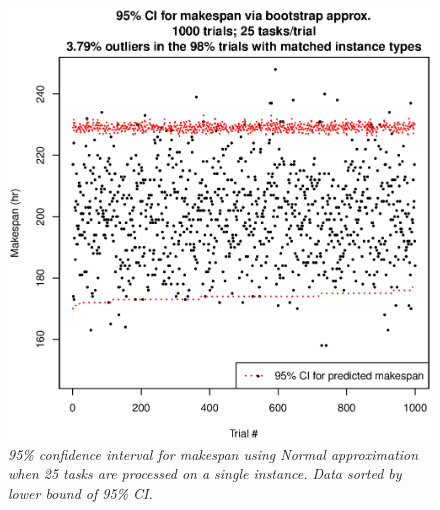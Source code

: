 \documentclass[12pt]{report}
\begin{document}
\begin{figure}
\includegraphics[width=1\textwidth]{validate-stochastic-runtimes-1000-trials-25-tasks.eps}
\caption{\textit{95\% confidence interval for makespan using Normal approximation when 25 tasks are processed on a single instance. Data sorted by lower bound of 95\% CI.}}
\label{fig:validate-stochastic-runtimes-1000-trials-25-tasks}
\end{figure}
\end{document}
